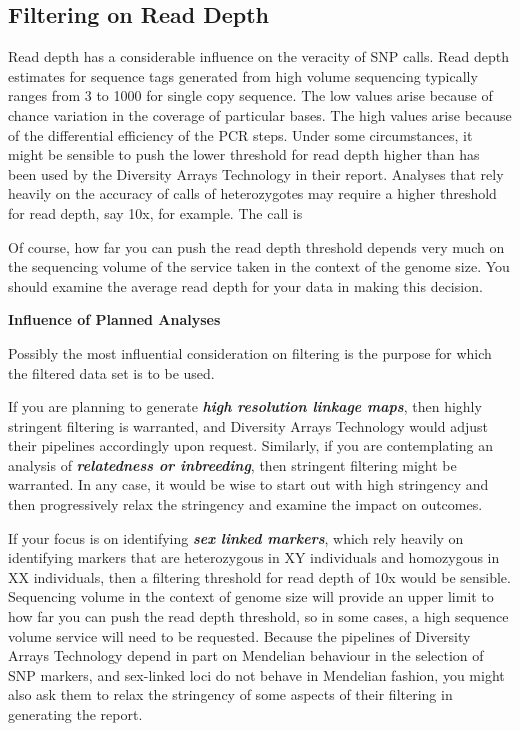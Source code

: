 \documentclass[
  letterpaper,
  DIV=11,
  numbers=noendperiod]{scrreprt}
\let\textttOrig\texttt
\renewcommand{\texttt}[1]{\textttOrig{\color{blue}{#1}}}
\begin{document}
\hypertarget{filtering-on-read-depth}{%
\subsection*{Filtering on Read Depth}\label{filtering-on-read-depth}}

Read depth has a considerable influence on the veracity of SNP calls.
Read depth estimates for sequence tags generated from high volume
sequencing typically ranges from 3 to 1000 for single copy sequence. The
low values arise because of chance variation in the coverage of
particular bases. The high values arise because of the differential
efficiency of the PCR steps. Under some circumstances, it might be
sensible to push the lower threshold for read depth higher than has been
used by the Diversity Arrays Technology in their report. Analyses that
rely heavily on the accuracy of calls of heterozygotes may require a
higher threshold for read depth, say 10x, for example. The call is

\texttt{gl.filter.rdepth(gl,threshold=10)}

Of course, how far you can push the read depth threshold depends very
much on the sequencing volume of the service taken in the context of the
genome size. You should examine the average read depth for your data in
making this decision.

\textbf{Influence of Planned Analyses}

Possibly the most influential consideration on filtering is the purpose
for which the filtered data set is to be used.

If you are planning to generate \textbf{\emph{high resolution linkage
maps}}, then highly stringent filtering is warranted, and Diversity
Arrays Technology would adjust their pipelines accordingly upon request.
Similarly, if you are contemplating an analysis of
\textbf{\emph{relatedness or inbreeding}}, then stringent filtering
might be warranted. In any case, it would be wise to start out with high
stringency and then progressively relax the stringency and examine the
impact on outcomes.

If your focus is on identifying \textbf{\emph{sex linked markers}},
which rely heavily on identifying markers that are heterozygous in XY
individuals and homozygous in XX individuals, then a filtering threshold
for read depth of 10x would be sensible. Sequencing volume in the
context of genome size will provide an upper limit to how far you can
push the read depth threshold, so in some cases, a high sequence volume
service will need to be requested. Because the pipelines of Diversity
Arrays Technology depend in part on Mendelian behaviour in the selection
of SNP markers, and sex-linked loci do not behave in Mendelian fashion,
you might also ask them to relax the stringency of some aspects of their
filtering in generating the report.
\end{document}
